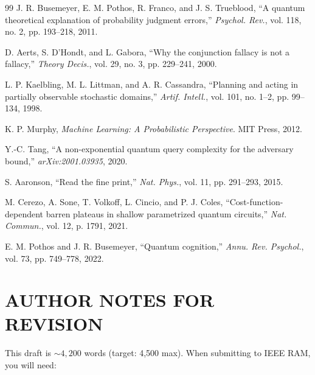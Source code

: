 \documentclass[conference]{IEEEtran}
\begin{document}
\begin{thebibliography}{99}
 J. R. Busemeyer, E. M. Pothos, R. Franco, and J. S. Trueblood, ``A quantum theoretical explanation of probability judgment errors,'' \textit{Psychol. Rev.}, vol. 118, no. 2, pp. 193--218, 2011.

 D. Aerts, S. D'Hondt, and L. Gabora, ``Why the conjunction fallacy is not a fallacy,'' \textit{Theory Decis.}, vol. 29, no. 3, pp. 229--241, 2000.

 L. P. Kaelbling, M. L. Littman, and A. R. Cassandra, ``Planning and acting in partially observable stochastic domains,'' \textit{Artif. Intell.}, vol. 101, no. 1--2, pp. 99--134, 1998.

 K. P. Murphy, \textit{Machine Learning: A Probabilistic Perspective}. MIT Press, 2012.

 Y.-C. Tang, ``A non-exponential quantum query complexity for the adversary bound,'' \textit{arXiv:2001.03935}, 2020.

 S. Aaronson, ``Read the fine print,'' \textit{Nat. Phys.}, vol. 11, pp. 291--293, 2015.

 M. Cerezo, A. Sone, T. Volkoff, L. Cincio, and P. J. Coles, ``Cost-function-dependent barren plateaus in shallow parametrized quantum circuits,'' \textit{Nat. Commun.}, vol. 12, p. 1791, 2021.

 E. M. Pothos and J. R. Busemeyer, ``Quantum cognition,'' \textit{Annu. Rev. Psychol.}, vol. 73, pp. 749--778, 2022.

\end{thebibliography}

\section*{AUTHOR NOTES FOR REVISION}

This draft is $\sim4,200$ words (target: 4,500 max). When submitting to IEEE RAM, you will need:
\end{document}
